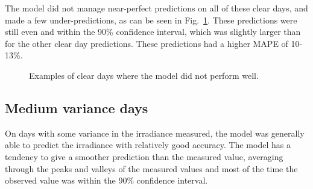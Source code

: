 The model did not manage near-perfect predictions on all of these clear days, and made a few under-predictions, as can be seen in Fig.~\ref{fig:full_low_worst}.
These predictions were still even and within the 90\% confidence interval, which was slightly larger than for the other clear day predictions. These predictions had a higher MAPE of 10-13\%.
\begin{figure}[ht!]
    \centering
    \qquad
    \qquad
    \caption{Examples of clear days where the model did not perform well.
    \label{fig:full_low_worst}}
\end{figure}


\subsection{Medium variance days}
On days with some variance in the irradiance measured, the model was generally able to predict the irradiance with relatively good accuracy.
The model has a tendency to give a smoother prediction than the measured value, averaging through the peaks and valleys of the measured values and most of the time the observed value was within the 90\% confidence interval. 

